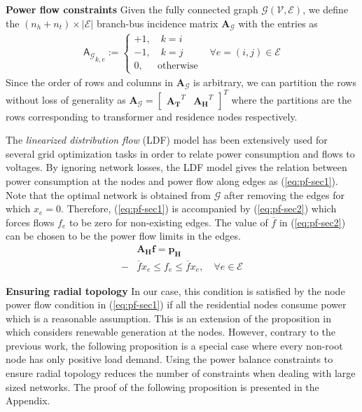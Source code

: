 \documentclass[sigconf]{acmart}
\begin{document}
\noindent\textbf{Power flow constraints}
Given the fully connected graph $\mathcal{G}(\mathcal{V},\mathcal{E})$, we define the $(n_h+n_t)\times|\mathcal{E}|$ branch-bus incidence matrix $\mathbf{A_{\mathcal{G}}}$ with the entries as
\begin{equation}
	\begin{matrix}
		\mathsf{A_{\mathcal{G}}}_{k,e}:=
		\begin{cases}
			+1,\quad k=i\\-1,\quad k=j\\0,\quad~~\textrm{otherwise}
		\end{cases}
		&\forall{e=(i,j)\in\mathcal{E}}
	\end{matrix}
	\label{eq:bus-incidence}
\end{equation}
Since the order of rows and columns in $\mathbf{A_{\mathcal{G}}}$ is arbitrary, we can partition the rows without loss of generality as $\mathbf{A_{\mathcal{G}}}=\begin{bmatrix}\mathbf{A_{T}}^T&\mathbf{A_{H}}^T\end{bmatrix}^T$ where the partitions are the rows corresponding to transformer and residence nodes respectively.

The \emph{linearized distribution flow} (LDF) model has been extensively used for several grid optimization tasks in order to relate power consumption and flows to voltages. By ignoring network losses, the LDF model gives the relation between power consumption at the nodes and power flow along edges as (\ref{eq:pf-sec1}).
Note that the optimal network is obtained from $\mathcal{G}$ after removing the edges for which $x_e=0$. Therefore, (\ref{eq:pf-sec1}) is accompanied by (\ref{eq:pf-sec2}) which forces flows $f_e$ to be zero for non-existing edges. The value of $\overline{f}$ in (\ref{eq:pf-sec2}) can be chosen to be the power flow limits in the edges.
\begin{subequations}
	\begin{align}
		&\mathbf{A_H}\mathbf{f}=\mathbf{p_H}\label{eq:pf-sec1}\\
		-&\overline{f}x_e\leq f_e\leq \overline{f}x_e,\quad \forall e\in\mathcal{E}\label{eq:pf-sec2}
	\end{align}
	\label{eq:pf-sec}
\end{subequations}

\noindent\textbf{Ensuring radial topology}
In our case, this condition is satisfied by the node power flow condition in (\ref{eq:pf-sec1}) if all the residential nodes consume power which is a reasonable assumption. This is an extension of the proposition in~\cite{manish2019} which considers renewable generation at the nodes. However, contrary to the previous work, the following proposition is a special case where every non-root node has only positive load demand. Using the power balance constraints to ensure radial topology reduces the number of constraints when dealing with large sized networks. The proof of the following proposition is presented in the Appendix.
\end{document}
